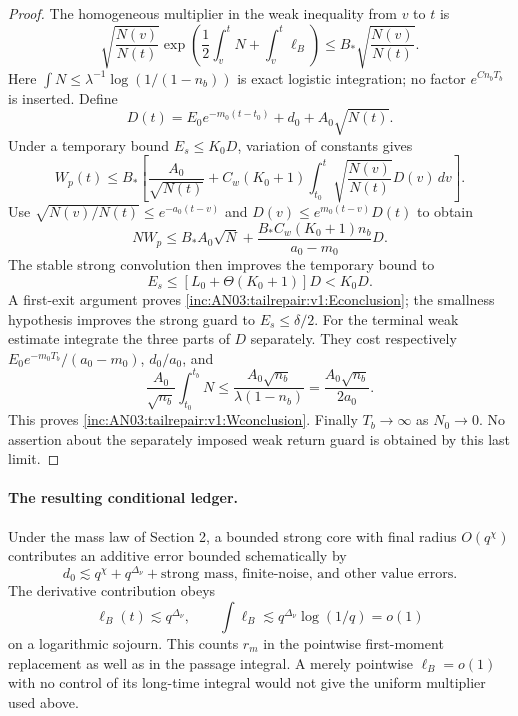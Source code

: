 \documentclass[11pt]{article}
\theoremstyle{remark}\newtheorem{remark}[theorem]{Remark}
\newcommand{\dd}{\,d}\newcommand{\E}{\mathbb E}
\begin{document}
\begin{proof}
The homogeneous multiplier in the weak inequality from $v$ to $t$ is
\[
 \sqrt{\frac{N(v)}{N(t)}}
 \exp\left(\frac12\int_v^tN+\int_v^t\ell_B\right)
 \le B_*\sqrt{\frac{N(v)}{N(t)}}.
\]
Here $\int N\le\lambda^{-1}\log(1/(1-n_b))$ is exact logistic integration; no factor $e^{C n_bT_b}$ is inserted. Define
\[
 D(t)=E_0e^{-m_0(t-t_0)}+d_0+A_0\sqrt{N(t)}.
\]
Under a temporary bound $E_s\le K_0D$, variation of constants gives
\[
 W_p(t)\le B_*\left[\frac{A_0}{\sqrt{N(t)}}
   +C_w(K_0+1)\int_{t_0}^t\sqrt{\frac{N(v)}{N(t)}}D(v)\dd v\right].
\]
Use $\sqrt{N(v)/N(t)}\le e^{-a_0(t-v)}$ and $D(v)\le e^{m_0(t-v)}D(t)$ to obtain
\[
 NW_p\le B_*A_0\sqrt N+
 \frac{B_*C_w(K_0+1)n_b}{a_0-m_0}D.
\]
The stable strong convolution then improves the temporary bound to
\[
 E_s\le[L_0+\Theta(K_0+1)]D<K_0D.
\]
A first-exit argument proves \eqref{inc:AN03:tailrepair:v1:Econclusion}; the smallness hypothesis improves the strong guard to $E_s\le\delta/2$. For the terminal weak estimate integrate the three parts of $D$ separately. They cost respectively $E_0e^{-m_0T_b}/(a_0-m_0)$, $d_0/a_0$, and
\[
 \frac{A_0}{\sqrt{n_b}}\int_{t_0}^{t_b}N
 \le\frac{A_0\sqrt{n_b}}{\lambda(1-n_b)}
 =\frac{A_0\sqrt{n_b}}{2a_0}.
\]
This proves \eqref{inc:AN03:tailrepair:v1:Wconclusion}. Finally $T_b\to\infty$ as $N_0\to0$. No assertion about the separately imposed weak return guard is obtained by this last limit.
\end{proof}

\paragraph{The resulting conditional ledger.}
Under the mass law of Section 2, a bounded strong core with final radius $O(q^\chi)$ contributes an additive error bounded schematically by
\[
 d_0\lesssim q^\chi+q^{\Delta_\nu}
       +\text{strong mass, finite-noise, and other value errors}.
\]
The derivative contribution obeys
\[
 \ell_B(t)\lesssim q^{\Delta_\nu},\qquad
 \int\ell_B\lesssim q^{\Delta_\nu}\log(1/q)=o(1)
\]
on a logarithmic sojourn. This counts $r_m$ in the pointwise first-moment replacement as well as in the passage integral. A merely pointwise $\ell_B=o(1)$ with no control of its long-time integral would not give the uniform multiplier used above.
\end{document}
